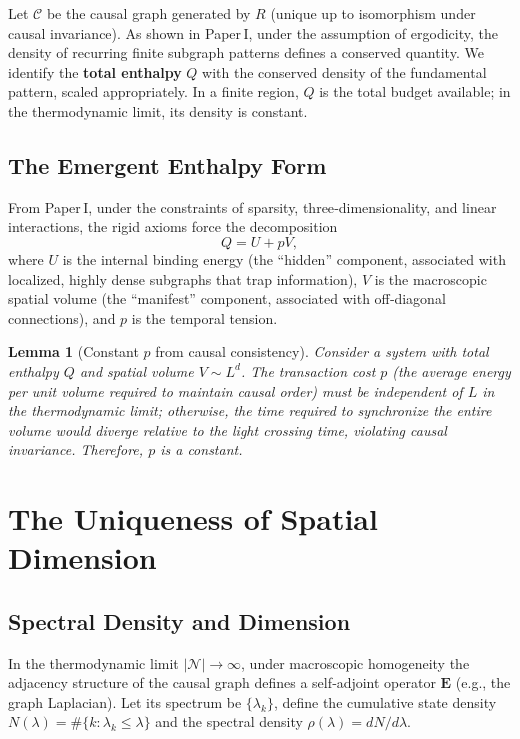 \documentclass{article}
\newtheorem{lemma}[theorem]{Lemma}
\begin{document}
Let $\mathcal{C}$ be the causal graph generated by $R$ (unique up to isomorphism under causal invariance). As shown in Paper I, under the assumption of ergodicity, the density of recurring finite subgraph patterns defines a conserved quantity. We identify the \textbf{total enthalpy} $Q$ with the conserved density of the fundamental pattern, scaled appropriately. In a finite region, $Q$ is the total budget available; in the thermodynamic limit, its density is constant.

\subsection{The Emergent Enthalpy Form}
From Paper I, under the constraints of sparsity, three‑dimensionality, and linear interactions, the rigid axioms force the decomposition
\[
Q = U + pV,
\]
where $U$ is the internal binding energy (the “hidden” component, associated with localized, highly dense subgraphs that trap information), $V$ is the macroscopic spatial volume (the “manifest” component, associated with off‑diagonal connections), and $p$ is the temporal tension.

\begin{lemma}[Constant $p$ from causal consistency]
Consider a system with total enthalpy $Q$ and spatial volume $V \sim L^d$. The transaction cost $p$ (the average energy per unit volume required to maintain causal order) must be independent of $L$ in the thermodynamic limit; otherwise, the time required to synchronize the entire volume would diverge relative to the light crossing time, violating causal invariance. Therefore, $p$ is a constant.
\end{lemma}

\section{The Uniqueness of Spatial Dimension}
\subsection{Spectral Density and Dimension}
In the thermodynamic limit $|\mathcal{N}| \to \infty$, under macroscopic homogeneity the adjacency structure of the causal graph defines a self‑adjoint operator $\mathbf{E}$ (e.g., the graph Laplacian). Let its spectrum be $\{\lambda_k\}$, define the cumulative state density $N(\lambda) = \#\{k : \lambda_k \le \lambda\}$ and the spectral density $\rho(\lambda) = dN/d\lambda$.
\end{document}
